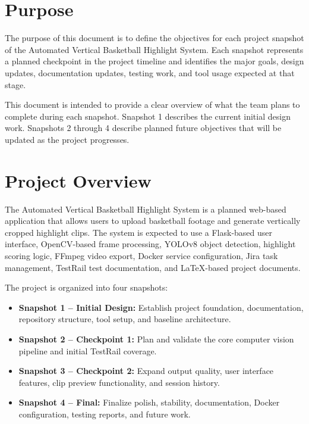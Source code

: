 \documentclass[12pt]{article}
\begin{document}
\newpage

\section{Purpose}

The purpose of this document is to define the objectives for each project snapshot of the Automated Vertical Basketball Highlight System. Each snapshot represents a planned checkpoint in the project timeline and identifies the major goals, design updates, documentation updates, testing work, and tool usage expected at that stage.

This document is intended to provide a clear overview of what the team plans to complete during each snapshot. Snapshot 1 describes the current initial design work. Snapshots 2 through 4 describe planned future objectives that will be updated as the project progresses.

\section{Project Overview}

The Automated Vertical Basketball Highlight System is a planned web-based application that allows users to upload basketball footage and generate vertically cropped highlight clips. The system is expected to use a Flask-based user interface, OpenCV-based frame processing, YOLOv8 object detection, highlight scoring logic, FFmpeg video export, Docker service configuration, Jira task management, TestRail test documentation, and LaTeX-based project documents.

The project is organized into four snapshots:

\begin{itemize}[noitemsep]
    \item \textbf{Snapshot 1 -- Initial Design:} Establish project foundation, documentation, repository structure, tool setup, and baseline architecture.
    \item \textbf{Snapshot 2 -- Checkpoint 1:} Plan and validate the core computer vision pipeline and initial TestRail coverage.
    \item \textbf{Snapshot 3 -- Checkpoint 2:} Expand output quality, user interface features, clip preview functionality, and session history.
    \item \textbf{Snapshot 4 -- Final:} Finalize polish, stability, documentation, Docker configuration, testing reports, and future work.
\end{itemize}
\end{document}
